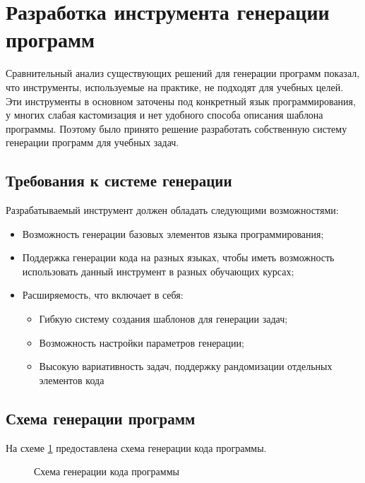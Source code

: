 \section{Разработка инструмента генерации программ}
Сравнительный анализ существующих решений для генерации программ показал, что
инструменты, используемые на практике, не подходят для учебных целей. Эти инструменты
в основном заточены под конкретный язык программирования, у многих слабая кастомизация
и нет удобного способа описания шаблона программы. Поэтому было принято решение
разработать собственную систему генерации программ для учебных задач.

\subsection{Требования к системе генерации}
Разрабатываемый инструмент должен обладать следующими возможностями:
\begin{itemize}
    \item Возможность генерации базовых элементов языка программирования;
    \item Поддержка генерации кода на разных языках, чтобы иметь возможность использовать данный
          инструмент в разных обучающих курсах;
    \item Расширяемость, что включает в себя:
          \begin{itemize}
              \item Гибкую систему создания шаблонов для генерации задач;
              \item Возможность настройки параметров генерации;
              \item Высокую вариативность задач, поддержку рандомизации отдельных элементов кода
          \end{itemize}
\end{itemize}

\subsection{Схема генерации программ}
На схеме \ref{generation-steps} предоставлена схема генерации кода программы.
\begin{figure}[ht]
    \begin{center}
        \scalebox{0.8}{
            
        }
        \caption{\label{generation-steps} Схема генерации кода программы}
    \end{center}
\end{figure}
\clearpage

